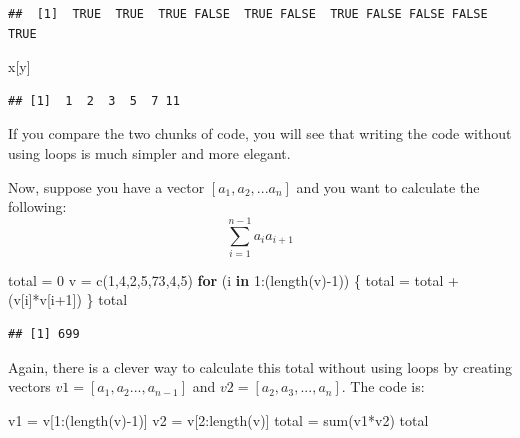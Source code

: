 \documentclass[
]{article}
\newenvironment{Shaded}{\begin{snugshade}}{\end{snugshade}}
\newcommand{\ControlFlowTok}[1]{\textcolor[rgb]{0.13,0.29,0.53}{\textbf{#1}}}
\newcommand{\DecValTok}[1]{\textcolor[rgb]{0.00,0.00,0.81}{#1}}
\newcommand{\FunctionTok}[1]{\textcolor[rgb]{0.00,0.00,0.00}{#1}}
\newcommand{\NormalTok}[1]{#1}
\newcommand{\OtherTok}[1]{\textcolor[rgb]{0.56,0.35,0.01}{#1}}
\newcommand{\SpecialCharTok}[1]{\textcolor[rgb]{0.00,0.00,0.00}{#1}}
\begin{document}
\begin{verbatim}
##  [1]  TRUE  TRUE  TRUE FALSE  TRUE FALSE  TRUE FALSE FALSE FALSE  TRUE
\end{verbatim}

\begin{Shaded}
\begin{Highlighting}[]
\NormalTok{x[y]}
\end{Highlighting}
\end{Shaded}

\begin{verbatim}
## [1]  1  2  3  5  7 11
\end{verbatim}

If you compare the two chunks of code, you will see that writing the
code without using loops is much simpler and more elegant.

Now, suppose you have a vector \([a_1, a_2,...a_n]\) and you want to
calculate the following:\\
\[\sum_{i = 1}^{n-1} a_ia_{i+1}\]

\begin{Shaded}
\begin{Highlighting}[]
\NormalTok{total }\OtherTok{=} \DecValTok{0}
\NormalTok{v }\OtherTok{=} \FunctionTok{c}\NormalTok{(}\DecValTok{1}\NormalTok{,}\DecValTok{4}\NormalTok{,}\DecValTok{2}\NormalTok{,}\DecValTok{5}\NormalTok{,}\DecValTok{73}\NormalTok{,}\DecValTok{4}\NormalTok{,}\DecValTok{5}\NormalTok{)}
\ControlFlowTok{for}\NormalTok{ (i }\ControlFlowTok{in} \DecValTok{1}\SpecialCharTok{:}\NormalTok{(}\FunctionTok{length}\NormalTok{(v)}\SpecialCharTok{{-}}\DecValTok{1}\NormalTok{))}
\NormalTok{\{}
\NormalTok{  total }\OtherTok{=}\NormalTok{ total }\SpecialCharTok{+}\NormalTok{ (v[i]}\SpecialCharTok{*}\NormalTok{v[i}\SpecialCharTok{+}\DecValTok{1}\NormalTok{]) }
\NormalTok{\}}
\NormalTok{total}
\end{Highlighting}
\end{Shaded}

\begin{verbatim}
## [1] 699
\end{verbatim}

Again, there is a clever way to calculate this total without using loops
by creating vectors \(v1 = [a_1, a_2...,a_{n-1}]\) and
\(v2 = [a_2, a_3, ...,a_n]\). The code is:

\begin{Shaded}
\begin{Highlighting}[]
\NormalTok{v1 }\OtherTok{=}\NormalTok{ v[}\DecValTok{1}\SpecialCharTok{:}\NormalTok{(}\FunctionTok{length}\NormalTok{(v)}\SpecialCharTok{{-}}\DecValTok{1}\NormalTok{)] }
\NormalTok{v2 }\OtherTok{=}\NormalTok{ v[}\DecValTok{2}\SpecialCharTok{:}\FunctionTok{length}\NormalTok{(v)]}
\NormalTok{total }\OtherTok{=} \FunctionTok{sum}\NormalTok{(v1}\SpecialCharTok{*}\NormalTok{v2) }
\NormalTok{total}
\end{Highlighting}
\end{Shaded}
\end{document}
